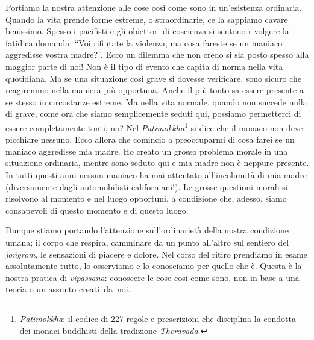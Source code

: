 Portiamo la nostra attenzione alle cose così come sono in un'esistenza ordinaria.
Quando la vita prende forme estreme, o straordinarie, ce la sappiamo
cavare benissimo. Spesso i pacifisti e gli obiettori di coscienza si
sentono rivolgere la fatidica domanda: ``Voi rifiutate la violenza; ma
cosa fareste se un maniaco aggredisse vostra madre?''. Ecco un dilemma
che non credo si sia posto spesso alla maggior parte di noi! Non è il
tipo di evento che capita di norma nella vita quotidiana. Ma se una
situazione così grave si dovesse verificare, sono sicuro che reagiremmo
nella maniera più opportuna. Anche il più tonto sa essere presente a se
stesso in circostanze estreme. Ma nella vita normale, quando non succede
nulla di grave, come ora che siamo semplicemente seduti qui, possiamo
permetterci di essere completamente tonti, no? Nel \textit{Pāṭimokkha}\footnote{\textit{Pāṭimokkha}: il codice di 227 regole e prescrizioni che
disciplina la condotta dei monaci buddhisti della tradizione \textit{Theravāda}.}
si dice che il monaco non deve picchiare nessuno. Ecco allora che
comincio a preoccuparmi di cosa farei se un maniaco aggredisse mia
madre. Ho creato un grosso problema morale in una situazione ordinaria,
mentre sono seduto qui e mia madre non è neppure presente. In tutti
questi anni nessun maniaco ha mai attentato all'incolumità di mia madre
(diversamente dagli automobilisti californiani!). Le grosse questioni
morali si risolvono al momento e nel luogo opportuni, a condizione che,
adesso, siamo consapevoli di questo momento e di questo luogo.

Dunque stiamo portando l'attenzione sull'ordinarietà della nostra
condizione umana; il corpo che respira, camminare da un punto all'altro
sul sentiero del \textit{joṅgrom}, le sensazioni di piacere e dolore. Nel corso
del ritiro prendiamo in esame assolutamente tutto, lo osserviamo e lo
conosciamo per quello che è. Questa è la nostra pratica di \textit{vipassanā}:
conoscere le cose così come sono, non in base a una teoria o un assunto
creati~da~noi.

